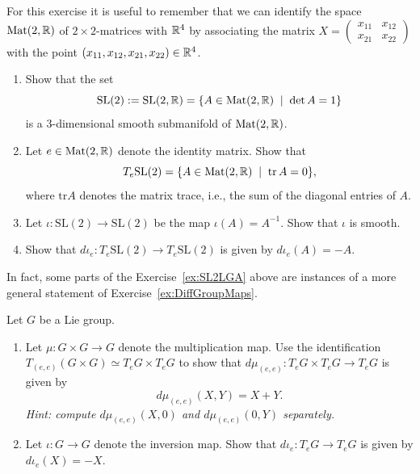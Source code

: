 \begin{exercise}\label{ex:SL2LGA}
	For this exercise it is useful to remember that we can identify the space $\mathrm{Mat}(2,\mathbb{R})$ of $2\times 2$-matrices with $\mathbb{R}^4$ by associating the matrix $X = \begin{pmatrix}x_{11} & x_{12}\\ x_{21} & x_{22}\end{pmatrix}$ with the point $(x_{11}, x_{12}, x_{21}, x_{22})\in\mathbb{R}^4$.

	\begin{enumerate}
		\item Show that the set
		      \begin{equation*}
			      \mathrm{SL}(2) := \mathrm{SL}(2,\mathbb{R}) = \{ A\in \mathrm{Mat}(2,\mathbb{R}) \;\mid\; \det A = 1 \}
		      \end{equation*}
		      is a 3-dimensional smooth submanifold of $\mathrm{Mat}(2,\mathbb{R})$.
		\item Let $e\in\mathrm{Mat}(2,\mathbb{R})$ denote the identity matrix. Show that
		      \begin{equation*}
			      T_e \mathrm{SL}(2) = \{ A\in \mathrm{Mat}(2,\mathbb{R}) \;\mid\; \mathrm{tr}\, A = 0 \},
		      \end{equation*}
		      where $\mathrm{tr} A$ denotes the matrix trace, i.e., the sum of the diagonal entries of $A$.
		\item Let $\iota: \mathrm{SL}(2)\to \mathrm{SL}(2)$ be the map $\iota(A) = A^{-1}$. Show that $\iota$ is smooth.
		\item Show that $d\iota_e: T_e\mathrm{SL}(2)\to T_e\mathrm{SL}(2)$ is given by $d\iota_e(A) = -A$.
	\end{enumerate}
\end{exercise}

In fact, some parts of the Exercise~\ref{ex:SL2LGA} above are instances of a more general statement of Exercise~\ref{ex:DiffGroupMaps}.

\begin{exercise}\label{ex:DiffGroupMaps}
	Let $G$ be a Lie group.
	\begin{enumerate}
		\item Let $\mu:G\times G\to G$ denote the multiplication map.
		      Use the identification $T_{(e,e)}(G\times G) \simeq T_eG\times T_eG$ to show that $d\mu_{(e,e)}:T_eG\times T_eG\to T_eG$ is given by
		      \begin{equation}
			      d\mu_{(e,e)}(X,Y) = X + Y.
		      \end{equation}
		      \textit{\small Hint: compute $d\mu_{(e,e)}(X,0)$ and $d\mu_{(e,e)}(0,Y)$ separately.}
		\item Let $\iota: G\to G$ denote the inversion map. Show that $d\iota_e:T_eG\to T_eG$ is given by $d\iota_e(X) = -X$.
	\end{enumerate}
\end{exercise}

